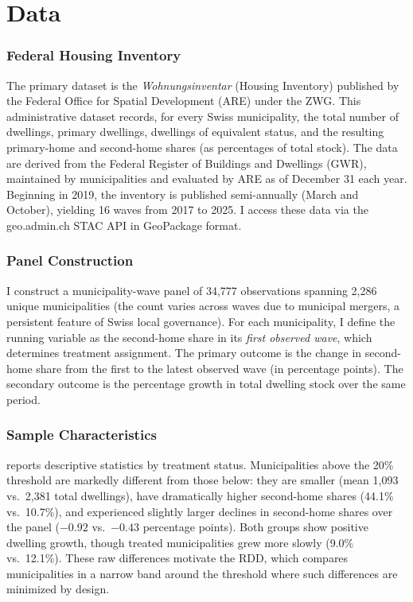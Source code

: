 \documentclass[12pt]{article}
\begin{document}
\section{Data}
\label{sec:data}

\subsubsection*{Federal Housing Inventory} The primary dataset is the \textit{Wohnungsinventar} (Housing Inventory) published by the Federal Office for Spatial Development (ARE) under the ZWG. This administrative dataset records, for every Swiss municipality, the total number of dwellings, primary dwellings, dwellings of equivalent status, and the resulting primary-home and second-home shares (as percentages of total stock). The data are derived from the Federal Register of Buildings and Dwellings (GWR), maintained by municipalities and evaluated by ARE as of December 31 each year. Beginning in 2019, the inventory is published semi-annually (March and October), yielding 16 waves from 2017 to 2025. I access these data via the geo.admin.ch STAC API in GeoPackage format.

\subsubsection*{Panel Construction} I construct a municipality-wave panel of 34,777 observations spanning 2,286 unique municipalities (the count varies across waves due to municipal mergers, a persistent feature of Swiss local governance). For each municipality, I define the running variable as the second-home share in its \textit{first observed wave}, which determines treatment assignment. The primary outcome is the change in second-home share from the first to the latest observed wave (in percentage points). The secondary outcome is the percentage growth in total dwelling stock over the same period.

\subsubsection*{Sample Characteristics}  reports descriptive statistics by treatment status. Municipalities above the 20\% threshold are markedly different from those below: they are smaller (mean 1,093 vs.\ 2,381 total dwellings), have dramatically higher second-home shares (44.1\% vs.\ 10.7\%), and experienced slightly larger declines in second-home shares over the panel ($-0.92$ vs.\ $-0.43$ percentage points). Both groups show positive dwelling growth, though treated municipalities grew more slowly (9.0\% vs.\ 12.1\%). These raw differences motivate the RDD, which compares municipalities in a narrow band around the threshold where such differences are minimized by design.
\end{document}
